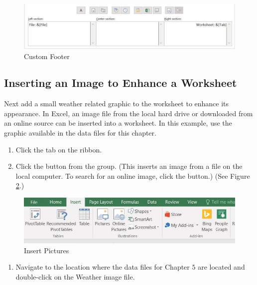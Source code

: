 \begin{figure}[H]
	\centering
	\includegraphics[width=\maxwidth{.95\linewidth}]{gfx/ch05_fig27}
	\caption{Custom Footer}
	\label{05:fig27}
\end{figure}

\subsection{Inserting an Image to Enhance a Worksheet}

Next add a small weather related graphic to the worksheet to enhance its appearance. In Excel, an image file from the local hard drive or downloaded from an online source can be inserted into a worksheet. In this example, use the graphic available in the data files for this chapter.

\begin{enumerate}
	\item Click the  tab on the ribbon.
	\item Click the  button from the  group. (This inserts an image from a file on the local computer. To search for an online image, click the  button.) (See Figure \ref{05:fig28}.)
\end{enumerate}

\begin{figure}[H]
	\centering
	\includegraphics[width=\maxwidth{.95\linewidth}]{gfx/ch05_fig28}
	\caption{Insert Pictures}
	\label{05:fig28}
\end{figure}

\begin{enumerate}[resume]
	\item Navigate to the location where the data files for Chapter $ 5 $ are located and double-click on the Weather image file.
\end{enumerate}

